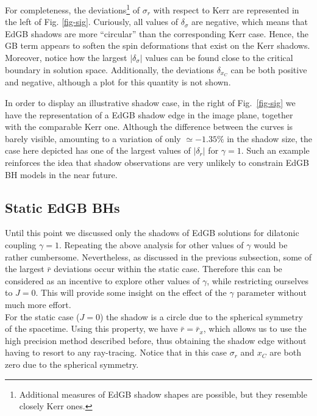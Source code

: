 \documentclass[12pt]{article}
\begin{document}
For completeness, the deviations\footnote{{Additional measures of EdGB shadow shapes are possible, but they resemble closely Kerr ones.}} of $\sigma_r$ with respect to Kerr are represented in the left of Fig. \ref{fig-sig}. Curiously, all values of $\delta_\sigma$ are negative, which means that EdGB shadows are more ``circular'' than the corresponding Kerr case. Hence, the GB term appears to soften the spin deformations that exist on the Kerr shadows. Moreover, notice how the largest $|\delta_\sigma|$ values can be found close to the critical boundary in solution space.
Additionally, the deviations $\delta_{x_C}$ can be both positive and negative, although a plot for this quantity is not shown.

In order to display an illustrative shadow case, in the right of Fig.~\ref{fig-sig} we have the representation of a EdGB shadow edge in the image plane, together with the comparable Kerr one. Although the difference between the curves is barely visible, amounting to a variation of only $\simeq-1.35\%$ in the shadow size, the case here depicted has one of the largest values of $|\delta_r|$ for $\gamma=1$. Such an example reinforces the idea that shadow observations are very unlikely to constrain EdGB BH models in the near future.




\subsection{Static EdGB BHs}

Until this point we discussed only the shadows of EdGB solutions for dilatonic coupling $\gamma=1$. Repeating the above analysis for other values of $\gamma$ would be rather cumbersome. Nevertheless, as discussed in the previous subsection, some of the largest $\bar{r}$ deviations occur within the static case. Therefore this can be considered as an incentive to explore other values of $\gamma$, while restricting ourselves to $J=0$. This will provide some insight on the effect of the $\gamma$ parameter without much more effort. \\

For the static case ($J=0$) the shadow is a circle due to the spherical symmetry of the spacetime. Using this property, we have $\bar{r}=\bar{r}_x$, which allows us to use the high precision method described before, thus obtaining the shadow edge without having to resort to any ray-tracing. Notice that in this case $\sigma_r$ and $x_C$ are both zero due to the spherical symmetry.\\
\end{document}
